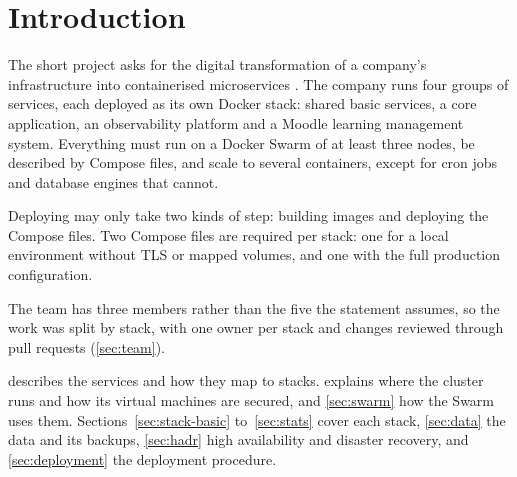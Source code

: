 \section{Introduction}
\label{sec:introduction}

The short project asks for the digital transformation of a company's
infrastructure into containerised microservices
\parencite{llusa2026project}. The company runs four groups of services,
each deployed as its own Docker stack: shared basic services, a core
application, an observability platform and a Moodle learning management
system. Everything must run on a Docker Swarm of at least three nodes,
be described by Compose files, and scale to several containers, except
for cron jobs and database engines that cannot.

Deploying may only take two kinds of step: building images and deploying
the Compose files. Two Compose files are required per stack: one for a
local environment without TLS or mapped volumes, and one with the full
production configuration.

The team has three members rather than the five the statement assumes,
so the work was split by stack, with one owner per stack and changes
reviewed through pull requests (\cref{sec:team}).

 describes the services and how they map to
stacks.  explains where the cluster runs and how
its virtual machines are secured, and \cref{sec:swarm} how the Swarm
uses them. Sections~\ref{sec:stack-basic}
to~\ref{sec:stats} cover each stack, \cref{sec:data} the data and
its backups, \cref{sec:hadr} high availability and disaster recovery, and
\cref{sec:deployment} the deployment procedure.
